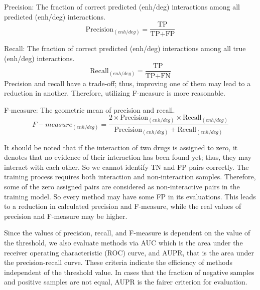 \documentclass{bmcart}
\begin{document}
Precision: The fraction of correct predicted (enh/deg) interactions among all predicted (enh/deg) interactions.
$$ \mbox{Precision}_{(enh/deg)} =  \frac{\mbox{TP}}{\mbox{TP} + \mbox{FP}} $$

Recall: The fraction of correct predicted (enh/deg) interactions among all true (enh/deg) interactions.
$$ \mbox{Recall}_{(enh/deg)} =  \frac{ \mbox{TP}}{\mbox{TP} + \mbox{FN}} $$
Precision and recall have a trade-off; thus, improving one of them may lead to a reduction in another. Therefore, utilizing F-measure is more reasonable.

F-measure: The geometric mean of precision and recall.
$$ F-measure_{(enh/deg)} = \frac{ 2\times \mbox{Precision}_{(enh/deg)} \times \mbox{Recall}_{(enh/deg)}}{\mbox{Precision}_{(enh/deg)} + \mbox{Recall}_{(enh/deg)}} $$

It should be noted that if the interaction of two drugs is assigned to zero, it denotes that no evidence of their interaction has been found yet; thus, they may interact with each other. So we cannot identify TN and FP pairs correctly. The training process requires both interaction and non-interaction samples. Therefore, some of the zero assigned pairs are considered as non-interactive pairs in the training model. So every method may have some FP in its evaluations. This leads to a reduction in calculated precision and F-measure, while the real values of precision and F-measure may be higher.

Since the values of precision, recall, and F-measure is dependent on the value of the threshold, we also evaluate methods via AUC which is the area under the receiver operating characteristic (ROC) curve, and AUPR, that is the area under the precision-recall curve. These criteria indicate the efficiency of methods independent of the threshold value. In cases that the fraction of negative samples and positive samples are not equal, AUPR is the fairer criterion for evaluation.



\end{document}
